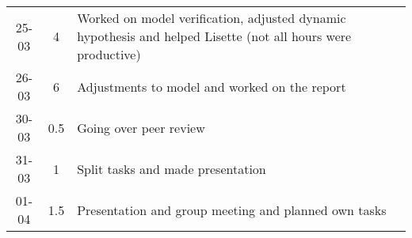 \begin{longtable}[c]{c|c|m{35em}}
25-03 & 4 & Worked on model verification, adjusted dynamic hypothesis and helped Lisette (not all hours were productive) \\ 
26-03 & 6 & Adjustments to model and worked on the report \\ 
30-03 & 0.5 & Going over peer review \\
31-03 & 1 & Split tasks and made presentation \\
01-04 & 1.5 & Presentation and group meeting and planned own tasks \\ 





\end{longtable}

